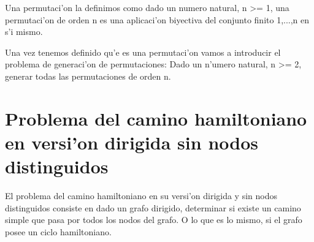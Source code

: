 \documentclass[12pt]{article}
\begin{document}
Una permutaci'on la definimos como dado un numero natural, n >= 1, una permutaci'on de orden n es una
aplicaci'on biyectiva del conjunto finito {1,...,n} en s'i mismo.

Una vez tenemos definido qu'e es una permutaci'on vamos a introducir el problema de generaci'on de
permutaciones: Dado un n'umero natural, n >= 2, generar todas las permutaciones de orden n.

\section{Problema del camino hamiltoniano en versi'on dirigida sin nodos distinguidos}

El problema del camino hamiltoniano en su versi'on dirigida y sin nodos distinguidos consiste en
dado un grafo dirigido, determinar si existe un camino simple que pasa por todos los nodos del grafo. O lo
que es lo mismo, si el grafo posee un ciclo hamiltoniano.

\printbibliography
\end{document}
